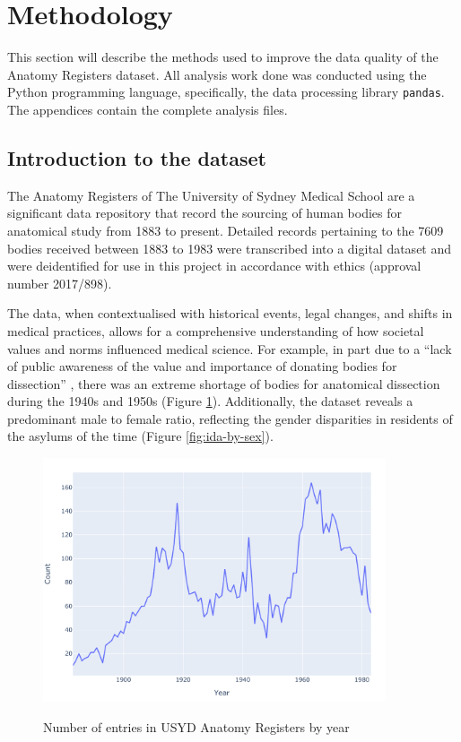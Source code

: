 \section{Methodology}

This section will describe the methods used to improve the data quality of the Anatomy Registers dataset. All analysis work done was conducted using the Python programming language, specifically, the data processing library \texttt{pandas}. The appendices contain the complete analysis files.

\subsection{Introduction to the dataset}

The Anatomy Registers of The University of Sydney Medical School are a significant data repository that record the sourcing of human bodies for anatomical study from 1883 to present. Detailed records pertaining to the 7609 bodies received between 1883 to 1983 were transcribed into a digital dataset \parencite{rebekah_jenkin} and were deidentified for use in this project in accordance with ethics (approval number 2017/898).

The data, when contextualised with historical events, legal changes, and shifts in medical practices, allows for a comprehensive understanding of how societal values and norms influenced medical science. For example, in part due to a ``lack of public awareness of the value and importance of donating bodies for dissection'' \parencite{rebekah_jenkin}, there was an extreme shortage of bodies for anatomical dissection during the 1940s and 1950s (Figure \ref{fig:ida-by-year}). Additionally, the dataset reveals a predominant male to female ratio, reflecting the gender disparities in residents of the asylums of the time (Figure \ref{fig:ida-by-sex}). 

\begin{figure}[p]
    \centering
    \caption{Number of entries in USYD Anatomy Registers by year}
    \includegraphics[width=0.9\textwidth]{REPORT/img/data_by_year.pdf}
    \label{fig:ida-by-year}
\end{figure}

